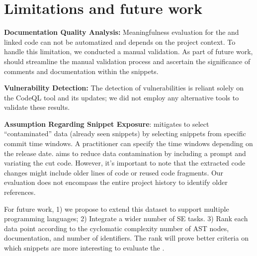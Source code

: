 \section{Limitations and future work}\label{sec:limitations}
\textbf{Documentation Quality Analysis:} Meaningfulness evaluation for the \docstring and linked code can not be automatized and depends on the project context. To handle this limitation, we conducted a manual validation. As part of future work, \snipgen should streamline the manual validation process and ascertain the significance of comments and documentation within the snippets.

\textbf{Vulnerability Detection:} The detection of vulnerabilities is reliant solely on the CodeQL tool and its updates; we did not employ any alternative tools to validate these results.

\textbf{Assumption Regarding Snippet Exposure}: \snipgen mitigates to select ``contaminated'' data (\ie already seen snippets) by selecting snippets from specific commit time windows. A practitioner can specify the time windows depending on the \llm release date. \snipgen aims to reduce data contamination by including a prompt and variating the cut code. However, it's important to note that the extracted code changes might include older lines of code or reused code fragments. Our evaluation does not encompass the entire project history to identify older references.

For future work, 1) we propose to extend this dataset to support multiple programming languages; 2) Integrate a wider number of SE tasks. 3) Rank each data point according to the cyclomatic complexity number of AST nodes, documentation, and number of identifiers. The rank will prove better criteria on which snippets are more interesting to evaluate the \llm.